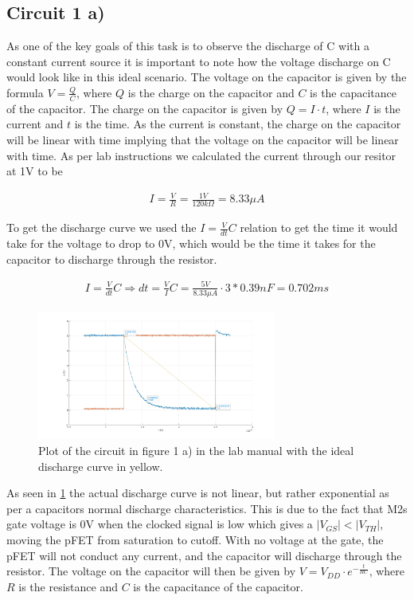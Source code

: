 \documentclass[onecolumn]{article}
\begin{document}
\subsection{Circuit 1 a)}
As one of the key goals of this task is to observe the discharge of C with a constant current source it is important to note how the voltage discharge on C would look like in this ideal scenario. The voltage on the capacitor is given by the formula $V = \frac{Q}{C}$, where $Q$ is the charge on the capacitor and $C$ is the capacitance of the capacitor. The charge on the capacitor is given by $Q = I \cdot t$, where $I$ is the current and $t$ is the time. As the current is constant, the charge on the capacitor will be linear with time implying that the voltage on the capacitor will be linear with time.
As per lab instructions we calculated the current through our resitor at 1V to be 

\begin{align}
    I = \frac{V}{R} = \frac{1V}{120k\Omega} = 8.33\mu A
\end{align}

To get the discharge curve we used the $I = \frac{V}{dt}C$ relation to get the time it would take for the voltage to drop to 0V, which would be the time it takes for the capacitor to discharge through the resistor.

\begin{align}
    I = \frac{V}{dt}C \Rightarrow dt = \frac{V}{I} C = \frac{5V}{8.33\mu A}\cdot 3*0.39nF = 0.702ms
\end{align}

\begin{figure}[h!]
    \centering
    \includegraphics[width=0.7\textwidth]{1a.jpg}
    \caption{Plot of the circuit in figure 1 a) in the lab manual with the ideal discharge curve in yellow.}
    \label{fig:task1a}
\end{figure}

As seen in \ref{fig:task1a} the actual discharge curve is not linear, but rather exponential as per a capacitors normal discharge characteristics. This is due to the fact that M2s gate voltage is 0V when the clocked signal is low which gives a $|V_{GS}| < |V_{TH}|$, moving the pFET from saturation to cutoff. With no voltage at the gate, the pFET will not conduct any current, and the capacitor will discharge through the resistor. The voltage on the capacitor will then be given by $V = V_{DD} \cdot e^{-\frac{t}{RC}}$, where $R$ is the resistance and $C$ is the capacitance of the capacitor.
\end{document}
